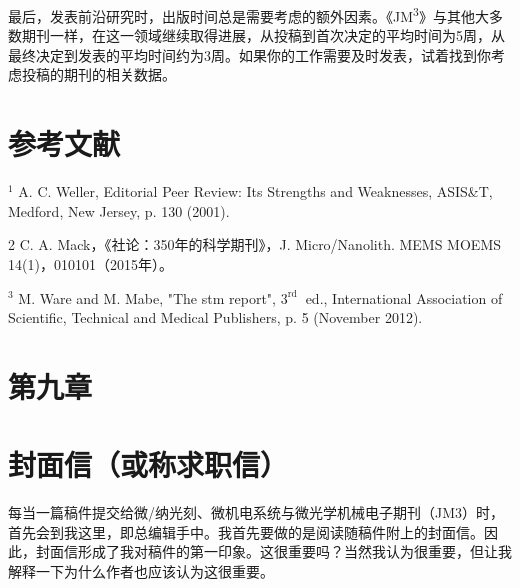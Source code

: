 最后，发表前沿研究时，出版时间总是需要考虑的额外因素。《JM\textsuperscript{3}》与其他大多数期刊一样，在这一领域继续取得进展，从投稿到首次决定的平均时间为5周，从最终决定到发表的平均时间约为3周。如果你的工作需要及时发表，试着找到你考虑投稿的期刊的相关数据。

\section*{参考文献}
${ }^{1}$ A. C. Weller, Editorial Peer Review: Its Strengths and Weaknesses, ASIS\&T, Medford, New Jersey, p. 130 (2001).

2 C. A. Mack，《社论：350年的科学期刊》，J. Micro/Nanolith. MEMS MOEMS 14(1)，010101（2015年）。

${ }^{3}$ M. Ware and M. Mabe, "The stm report", $3^{\text{rd }}$ ed., International Association of Scientific, Technical and Medical Publishers, p. 5 (November 2012).

\section*{第九章}
\section*{封面信（或称求职信）}
每当一篇稿件提交给微/纳光刻、微机电系统与微光学机械电子期刊（JM3）时，首先会到我这里，即总编辑手中。我首先要做的是阅读随稿件附上的封面信。因此，封面信形成了我对稿件的第一印象。这很重要吗？当然我认为很重要，但让我解释一下为什么作者也应该认为这很重要。

